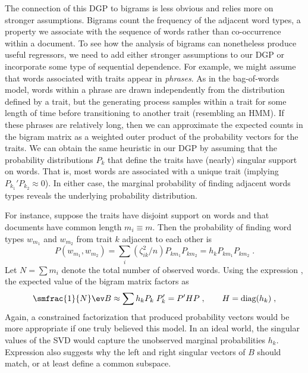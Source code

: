\documentclass[10pt]{article}
\begin{document}
The connection of this DGP to bigrams is less obvious and relies more on stronger assumptions.  Bigrams count the frequency of the adjacent word types, a property we associate with the sequence of words rather than co-occurrence within a document.  To see how the analysis of bigrams can nonetheless produce useful regressors, we need to add either stronger assumptions to our DGP or incorporate some type of sequential dependence.  For example, we might assume that words associated with traits appear in {\em phrases}.   As in the bag-of-words model, words within a phrase are drawn independently from the distribution defined by a trait, but the generating process samples within a trait for some length of time before transitioning to another trait (resembling an HMM).  If these phrases are relatively long, then we can approximate the expected counts in the bigram matrix as a weighted outer product of the probability vectors for the traits.  We can obtain the same heuristic in our DGP by assuming that the probability distributions $P_k$ that define the traits have (nearly) singular support on words.  That is, most words are associated with a unique trait (implying $P_{k_1}'P_{k_2}  \approx 0$).  In either case, the marginal probability of finding adjacent words types reveals the underlying probability distribution.  


For instance, suppose the traits have disjoint support on words and that documents have common length $m_i \equiv m$. Then the probability of finding  word types  $w_{m_1}$ and $w_{m_2}$ from trait $k$ adjacent to each other is 
 \begin{equation}
  P(w_{m_1},w_{m_2}) = \sum_i \left(\zeta_{ik}^2/n \right) P_{km_1} P_{km_2} 
                                     = h_k P_{km_1} P_{km_2}  \;.
  \label{eq:joint}
\end{equation}
Let $N = \sum m_i$ denote the total number of observed words. Using the expression , the expected value of the bigram matrix factors as
 \begin{equation}
    \smfrac{1}{N} \ev B \approx \sum h_k P_k\; P_k' = P' H P \;, 
                     \qquad  H = \mbox{diag}(h_k)\;,
 \label{eq:B2}
 \end{equation}
Again, a constrained factorization that produced probability vectors would be more appropriate if one truly believed this model.  In an ideal world, the singular values of the SVD would capture the unobserved marginal probabilities  $h_k$.  Expression  also suggests why the left and right singular vectors of $B$ should match, or at least define a common subspace.
\end{document}
